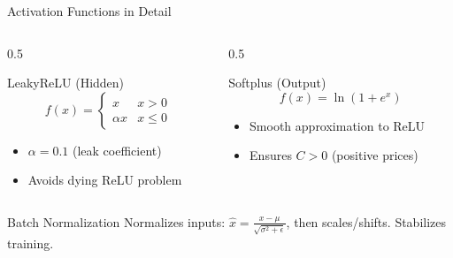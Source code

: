 \documentclass{beamer}
\begin{document}
\begin{frame}{Activation Functions in Detail}
    \small
    \begin{columns}
        \begin{column}{0.5\textwidth}
            \begin{block}{LeakyReLU (Hidden)}
                \begin{equation}
                    f(x) = \begin{cases} x & x > 0 \\ \alpha x & x \leq 0 \end{cases}
                \end{equation}
                \begin{itemize}
                    \item $\alpha = 0.1$ (leak coefficient)
                    \item Avoids dying ReLU problem
                \end{itemize}
            \end{block}
        \end{column}
        \begin{column}{0.5\textwidth}
            \begin{block}{Softplus (Output)}
                \begin{equation}
                    f(x) = \ln(1 + e^x)
                \end{equation}
                \begin{itemize}
                    \item Smooth approximation to ReLU
                    \item Ensures $C > 0$ (positive prices)
                \end{itemize}
            \end{block}
        \end{column}
    \end{columns}

    \begin{block}{Batch Normalization}
        Normalizes inputs: $\hat{x} = \frac{x - \mu}{\sqrt{\sigma^2 + \epsilon}}$, then scales/shifts. Stabilizes training.
    \end{block}
\end{frame}
\end{document}
